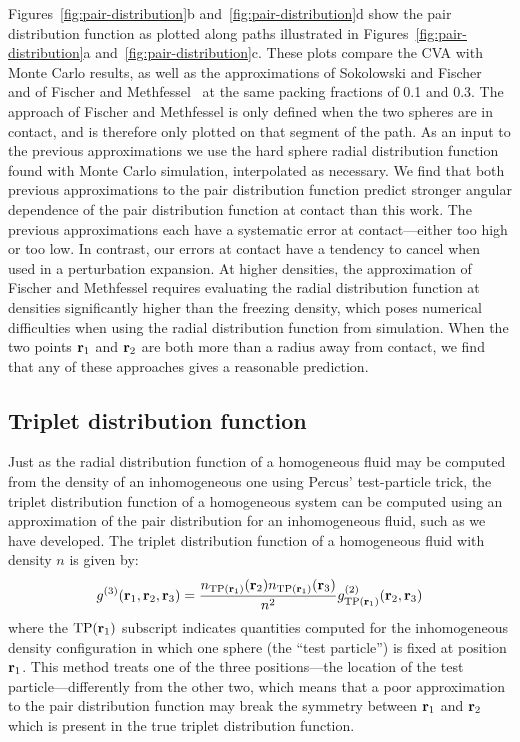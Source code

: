 Figures~\ref{fig:pair-distribution}b and~\ref{fig:pair-distribution}d
show the pair distribution function as plotted along paths illustrated
in Figures~\ref{fig:pair-distribution}a
and~\ref{fig:pair-distribution}c.  These plots compare the CVA with
Monte Carlo results, as well as the approximations of Sokolowski and
Fischer~\cite{sokolowski1992role} and of Fischer and
Methfessel~\cite{fischer1980born} at the same packing fractions of 0.1
and 0.3.  The approach of Fischer and Methfessel is only defined when
the two spheres are in contact, and is therefore only plotted on that
segment of the path.  As an input to the previous approximations we
use the hard sphere radial distribution function found with Monte
Carlo simulation, interpolated as necessary. We find that both
previous approximations to the pair distribution function predict
stronger angular dependence of the pair distribution function at
contact than this work.  The previous approximations each have a
systematic error at contact---either too high or too low.  In
contrast, our errors at contact have a tendency to cancel when used in
a perturbation expansion.  At higher densities, the approximation of
Fischer and Methfessel requires evaluating the radial distribution
function at densities significantly higher than the freezing density,
which poses numerical difficulties when using the radial distribution
function from simulation.  When the two points $\textbf{r}_1$ and $\textbf{r}_2$ are
both more than a radius away from contact, we find that any of these
approaches gives a reasonable prediction.

\subsection{Triplet distribution function}

Just as the radial distribution function of a homogeneous fluid may be
computed from the density of an inhomogeneous one using Percus'
test-particle trick, the triplet distribution function of a
homogeneous system can be computed using an approximation of the pair
distribution for an inhomogeneous fluid, such as we have
developed. The triplet distribution function of a homogeneous fluid
with density $n$ is given by:
\begin{align}
    g^{(3)}(\textbf{r}_1,\textbf{r}_2,\textbf{r}_3) =
    \frac{n_{\textrm{TP}(\textbf{r}_1)}(\textbf{r}_2)
      n_{\textrm{TP}(\textbf{r}_1)}(\textbf{r}_3)}{n^2}
    g^{(2)}_{\textrm{TP}(\textbf{r}_1)}(\textbf{r}_2,\textbf{r}_3)
\end{align}
where the $\textrm{TP}(\textbf{r}_1)$ subscript indicates quantities computed for
the inhomogeneous density configuration in which one sphere (the
``test particle'') is fixed
at position $\textbf{r}_1$.  This method treats one of the three
positions---the location of the test particle---differently from the
other two, which means that a poor approximation to the pair distribution
function may break the symmetry between $\textbf{r}_1$ and $\textbf{r}_2$ which is
present in the true triplet distribution function.

